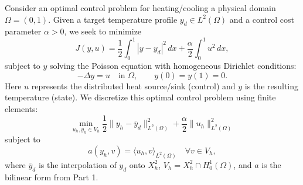 \documentclass[a4paper,10pt]{article}
\begin{document}
Consider an optimal control problem for heating/cooling a physical domain $\Omega=(0,1)$.
Given a target temperature profile $y_d \in L^2(\Omega)$ and a control cost parameter $\alpha > 0$, we seek to minimize
$$
	J(y,u) = \frac{1}{2}\int_0^1 |y-y_d|^2\,dx + \frac{\alpha}{2}\int_0^1 u^2\,dx,
$$
subject to $y$ solving the Poisson equation with homogeneous Dirichlet conditions:
$$
	-\Delta y = u \quad\text{in }\Omega, \qquad y(0) = y(1) = 0.
$$
Here $u$ represents the distributed heat source/sink (control) and $y$ is the resulting temperature (state).
We discretize this optimal control problem using finite elements:
\[
	\min_{u_h,y_h\in V_h} \frac{1}{2}\|y_h - \bar{y}_d\|^2_{L^2(\Omega)} + \frac{\alpha}{2}\|u_h\|^2_{L^2(\Omega)}
\]
subject to
\[
	a(y_h,v) = \langle u_h,v \rangle_{L^2(\Omega)} \quad \forall v\in V_h,
\]
where $\bar{y}_d$ is the interpolation of $y_d$ onto $X^2_h$, $V_h = X^2_h \cap H^1_0(\Omega)$, and $a$ is the bilinear form from Part 1.
\end{document}
